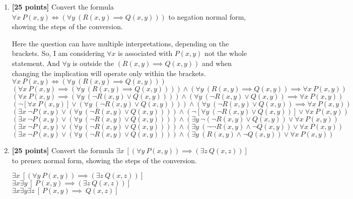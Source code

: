 \documentclass{article}
\begin{document}
\begin{enumerate}
\item \textbf{[25 points]} Convert the formula
  $\forall x\ P(x,y) \iff (\forall y\ (R(x,y) \implies Q(x,y)))$ to
  negation normal form, showing the steps of the conversion.
  \begin{answer}
  Here the question can have multiple interpretations, depending on the brackets. So, I am considering $\forall x $ is associated with $P(x,y)$ not the whole statement. And $\forall y$ is outside the $(R(x,y) \implies Q(x,y))$ and when changing the implication will operate only within the brackets.\\
  $\forall x\ P(x,y) \iff (\forall y\ (R(x,y) \implies Q(x,y)))$\\
  $(\forall x\ P(x,y) \implies (\forall y\ (R(x,y) \implies Q(x,y)))) \land (\forall y\ (R(x,y) \implies Q(x,y)) \implies \forall x\ P(x,y) )$ \\
  $(\forall x\ P(x,y) \implies (\forall y\ ( \neg R(x,y) \lor Q(x,y)))) \land (\forall y\ (\neg R(x,y) \lor Q(x,y)) \implies \forall x\ P(x,y) )$ \\
  $(\neg [\forall x\ P(x,y)] \lor (\forall y\ ( \neg R(x,y) \lor Q(x,y)))) \land (\forall y\ (\neg R(x,y) \lor Q(x,y)) \implies \forall x\ P(x,y) )$ \\
  $(\exists x\ \neg P(x,y) \lor (\forall y\ ( \neg R(x,y) \lor Q(x,y)))) \land (\neg [\forall y\  (\neg R(x,y) \lor Q(x,y))] \lor \forall x\ P(x,y) )$ \\
  $(\exists x\ \neg P(x,y) \lor (\forall y\ ( \neg R(x,y) \lor Q(x,y)))) \land (\exists y\ \neg (\neg R(x,y) \lor Q(x,y)) \lor \forall x\ P(x,y) )$ \\
 $(\exists x\ \neg P(x,y) \lor (\forall y\ ( \neg R(x,y) \lor Q(x,y)))) \land (\exists y\ (\neg \neg R(x,y) \land \neg Q(x,y)) \lor \forall x\ P(x,y) )$ \\ 
 $(\exists x\ \neg P(x,y) \lor (\forall y\ ( \neg R(x,y) \lor Q(x,y)))) \land (\exists y\ ( R(x,y) \land \neg Q(x,y)) \lor \forall x\ P(x,y) )$ \\
 \end{answer}

\item \textbf{[25 points]} Convert the formula
  $\exists x\ [(\forall y\ P(x,y)) \implies (\exists z\ Q(x,z))]$ to
  prenex normal form, showing the steps of the conversion.
    \begin{answer}
    $\exists x\ [(\forall y\ P(x,y)) \implies (\exists z\ Q(x,z))]$\\
    $\exists x \exists y \ [\ P(x,y) \implies (\exists z\ Q(x,z))]$\\
    $\exists x \exists y \exists z \ [\ P(x,y) \implies \ Q(x,z)]$\\
  \end{answer}


\end{enumerate}
\end{document}
